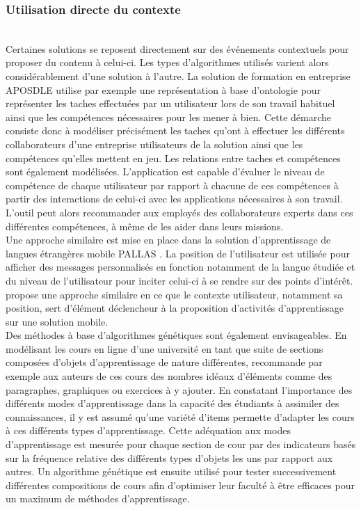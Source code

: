 \documentclass[conference]{./sty/IEEEtran}
\begin{document}
\subsubsection{Utilisation directe du contexte}
~\\
Certaines solutions se reposent directement sur des événements contextuels
pour proposer du contenu à celui-ci. Les types d'algorithmes utilisés varient
alors considérablement d'une solution à l'autre. La solution de formation en
entreprise APOSDLE utilise par exemple une représentation à base d'ontologie
pour représenter les taches effectuées par un utilisateur lors de son travail
habituel ainsi que les compétences nécessaires pour les mener à
bien\cite{DBLP:journals/procedia/BehamKLL10}. Cette démarche consiste donc à
modéliser précisément les taches qu'ont à effectuer les différents
collaborateurs d'une entreprise utilisateurs de la solution ainsi que les
compétences qu'elles mettent en jeu. Les relations entre taches et compétences
sont également modélisées. L'application est capable d'évaluer le niveau de
compétence de chaque utilisateur par rapport à chacune de ces compétences à
partir des interactions de celui-ci avec les applications nécessaires à son
travail. L'outil peut alors recommander aux employés des collaborateurs experts
dans ces différentes compétences, à même de les aider dans leurs missions. \\

Une approche similaire est mise en place dans la solution d'apprentissage de
langues étrangères mobile PALLAS \cite{DBLP:conf/wmte/PetersenM06}. La position
de l'utilisateur est utilisée pour afficher des messages personnalisés en
fonction notamment de la langue étudiée et du niveau de l'utilisateur pour
inciter celui-ci à se rendre sur des points d'intérêt.
\cite{Kurti:2008:CMS:1456223.1456331} propose une approche similaire en ce que
le contexte utilisateur, notamment sa position, sert d'élément déclencheur à la
proposition d'activités d'apprentissage sur une solution mobile. \\

Des méthodes à base d'algorithmes génétiques sont également envisageables. En
modélisant les cours en ligne d'une université en tant que suite de sections
composées d'objets d'apprentissage de nature différentes,
\cite{smartECourseRecommander} recommande par exemple aux auteurs de ces cours
des nombres idéaux d'éléments comme des paragraphes, graphiques ou exercices à
y ajouter. En constatant l'importance des différents modes d'apprentissage dans
la capacité des étudiants à assimiler des connaissances, il y est assumé qu'une
variété d'items permette d'adapter les cours à ces différents types
d'apprentissage. Cette adéquation aux modes d'apprentissage est mesurée pour
chaque section de cour par des indicateurs basés sur la fréquence relative des
différents types d'objets les uns par rapport aux autres. Un algorithme
génétique est ensuite utilisé pour tester successivement différentes
compositions de cours afin d'optimiser leur faculté à être efficaces pour un
maximum de méthodes d'apprentissage. \\
\end{document}
